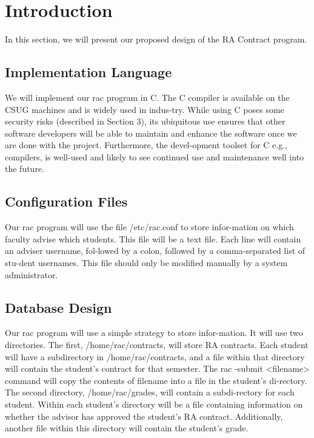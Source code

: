 \section{Introduction}
\label{section:intro}

In this section, we will present our proposed design of the RA Contract program.

\subsection{Implementation Language}

We will implement our rac program in C.  The C compiler is available on the CSUG machines and is widely used in indus-try.  While using C poses some security risks (described in Section 3), its ubiquitous use ensures that other software developers will be able to maintain and enhance the software once we are done with the project.  Furthermore, the devel-opment toolset for C e.g., compilers, is well-used and likely to see continued use and maintenance well into the future.

\subsection{Configuration Files}
 Our rac program will use the file /etc/rac.conf to store infor-mation on which faculty advise which students.  This file will be a text file.  Each line will contain an adviser username, fol-lowed by a colon, followed by a comma-separated list of stu-dent usernames.  This file should only be modified manually by a system administrator.

\subsection{Database Design}
Our rac program will use a simple strategy to store infor-mation.  It will use two directories.  The first,  /home/rac/contracts, will store RA contracts.  Each student will have a subdirectory in /home/rac/contracts, and a file within that directory will contain the student’s contract for that semester.  The rac -submit <filename> command will copy the contents of filename into a file in the student’s di-rectory.
The second directory, /home/rac/grades, will contain a subdi-rectory for each student.  Within each student’s directory will be a file containing information on whether the advisor has approved the student’s RA contract.  Additionally, another file within this directory will contain the student’s grade.

